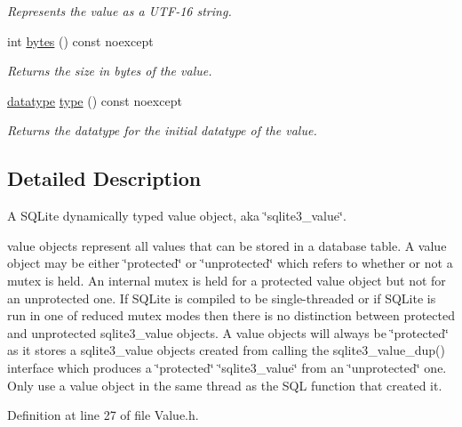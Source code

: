 \begin{DoxyCompactItemize}
\begin{DoxyCompactList}\small\item\em Represents the value as a U\-T\-F-\/16 string. \end{DoxyCompactList}\item 
int \hyperlink{a00015_a089b0cb550fd7ca7830ebf1cb43850d1}{bytes} () const noexcept
\begin{DoxyCompactList}\small\item\em Returns the size in bytes of the value. \end{DoxyCompactList}\item 
\hyperlink{a00038_a7467e5cdd32bbf7fce35aced88682dc0}{datatype} \hyperlink{a00015_a1dbe99607518010c9fd134b0816bb451}{type} () const noexcept
\begin{DoxyCompactList}\small\item\em Returns the datatype for the initial datatype of the value. \end{DoxyCompactList}\end{DoxyCompactItemize}


\subsection{Detailed Description}
A S\-Q\-Lite dynamically typed value object, aka \char`\"{}sqlite3\-\_\-value\char`\"{}. 

value objects represent all values that can be stored in a database table. A value object may be either \char`\"{}protected\char`\"{} or \char`\"{}unprotected\char`\"{} which refers to whether or not a mutex is held. An internal mutex is held for a protected value object but not for an unprotected one. If S\-Q\-Lite is compiled to be single-\/threaded or if S\-Q\-Lite is run in one of reduced mutex modes then there is no distinction between protected and unprotected sqlite3\-\_\-value objects. A value objects will always be \char`\"{}protected\char`\"{} as it stores a sqlite3\-\_\-value objects created from calling the sqlite3\-\_\-value\-\_\-dup() interface which produces a \char`\"{}protected\char`\"{} \char`\"{}sqlite3\-\_\-value\char`\"{} from an \char`\"{}unprotected\char`\"{} one. Only use a value object in the same thread as the S\-Q\-L function that created it. 

Definition at line 27 of file Value.\-h.



